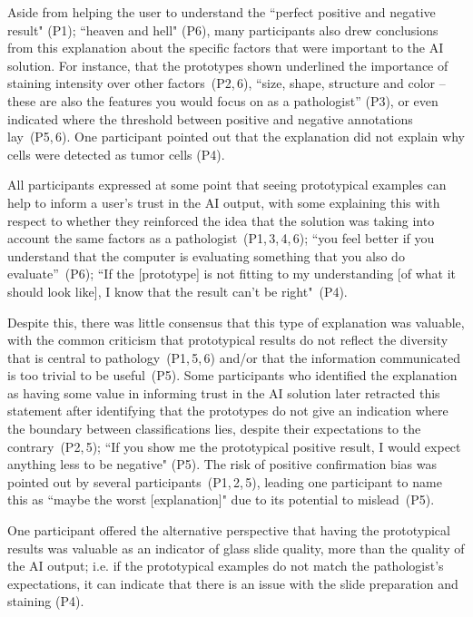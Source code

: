 \documentclass[final,5p,times,twocolumn,hyphens]{elsarticle} %
\providecommand{\DIFaddend}{} %
\DeclareRobustCommand{\DIFaddend}{\DIFOaddend \let\includegraphics\DIFOincludegraphics} %
\begin{document}
\DIFaddend 

Aside from helping the user to understand the ``perfect positive and negative result" (P1); ``heaven and hell" (P6), many participants also drew conclusions from this explanation about the specific factors that were important to the AI solution. For instance, that the prototypes shown underlined the importance of staining intensity over other factors~(P2,\,6), ``size, shape, structure and color -- these are also the features you would focus on as a pathologist” (P3), or even indicated where the threshold between positive and negative annotations lay~(P5,\,6). One participant pointed out that the explanation did not explain why cells were detected as tumor cells (P4).

All participants expressed at some point that seeing prototypical examples can help to inform a user's trust in the AI output, with some explaining this with respect to whether they reinforced the idea that the solution was taking into account the same factors as a pathologist~(P1,\,3,\,4,\,6); “you feel better if you understand that the computer is evaluating something that you also do evaluate”~(P6); ``If the [prototype] is not fitting to my understanding [of what it should look like], I know that the result can't be right"~(P4). 

Despite this, there was little consensus that this type of explanation was valuable, with the common criticism that prototypical results do not reflect the diversity that is central to pathology~(P1,\,5,\,6) and/or that the information communicated is too trivial to be useful~(P5). Some participants who identified the explanation as having some value in informing trust in the AI solution later retracted this statement after identifying that the prototypes do not give an indication where the boundary between classifications lies, despite their expectations to the contrary~(P2,\,5); ``If you show me the prototypical positive result, I would expect anything less to be negative" (P5). The risk of positive confirmation bias was pointed out by several participants~(P1,\,2,\,5), leading one participant to name this as ``maybe the worst [explanation]" due to its potential to mislead~(P5).

One participant offered the alternative perspective that having the prototypical results was valuable as an indicator of glass slide quality, more than the quality of the AI output; i.e. if the prototypical examples do not match the pathologist's expectations, it can indicate that there is an issue with the slide preparation and staining (P4).
\end{document}
